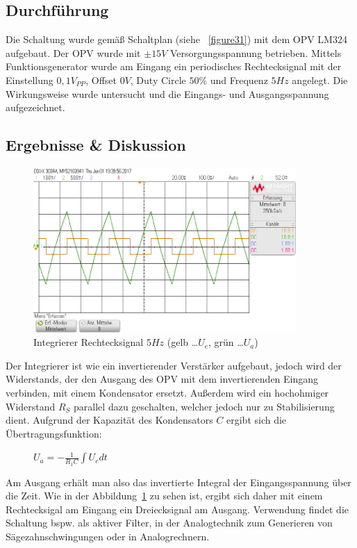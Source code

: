\documentclass[12pt,a4paper,titlepage]{article}
\begin{document}
\subsection*{Durchf\"uhrung}
Die Schaltung wurde gemäß Schaltplan (siehe ~\ref{figure31}) mit dem OPV LM324 aufgebaut. Der OPV wurde mit $\pm 15V$ Versorgungsspannung betrieben. Mittels Funktionsgenerator wurde am Eingang ein periodisches Rechtecksignal mit der Einstellung $0,1 V_{PP}$, Offset $0V$, Duty Circle $50\%$ und Frequenz $5Hz$ angelegt. Die Wirkungsweise wurde untersucht und die Eingangs- und Ausgangsspannung aufgezeichnet.

\subsection*{Ergebnisse \& Diskussion}
\begin{figure}[H]
  \centering
  \includegraphics[width=100mm]{integrierer_rechtecksignal_eingang_ausgang.png}
  \caption{Integrierer Rechtecksignal $5Hz$ (gelb \dots $U_e$, gr\"un \dots $U_a$)}
  \label{figure32}
\end{figure}
Der Integrierer ist wie ein invertierender Verst\"arker aufgebaut, jedoch wird der Widerstands, der den Ausgang des OPV mit dem invertierenden Eingang verbinden, mit einem Kondensator ersetzt. Au\ss erdem wird ein hochohmiger Widerstand $R_S$ parallel dazu geschalten, welcher jedoch nur zu Stabilisierung dient. Aufgrund der Kapazit\"at des Kondensators $C$ ergibt sich die \"Ubertragungsfunktion:
\begin{figure}[H]
\centering
$U_a = - \frac{1}{R_1C} \int U_e dt$
\end{figure}
\noindent Am Ausgang erh\"alt man also das invertierte Integral der Eingangsspannung \"uber die Zeit. Wie in der Abbildung~\ref{figure32} zu sehen ist, ergibt sich daher mit einem Rechtecksigal am Eingang ein Dreiecksignal am Ausgang. Verwendung findet die Schaltung bspw. als aktiver Filter, in der Analogtechnik zum Generieren von S\"agezahnschwingungen oder in Analogrechnern.
\end{document}
